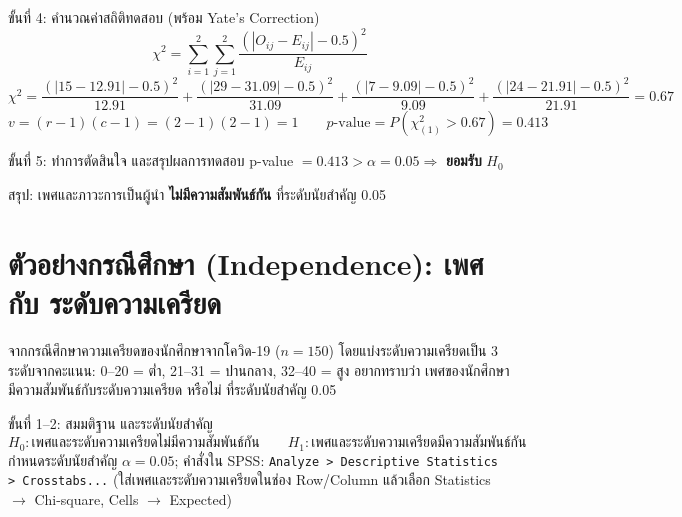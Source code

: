 \documentclass[10pt]{extarticle}
\begin{document}
\begin{stepbox}{ขั้นที่ 4: คำนวณค่าสถิติทดสอบ (พร้อม Yate's Correction)}
$$\chi^2=\sum_{i=1}^2\sum_{j=1}^2\frac{\left(|O_{ij}-E_{ij}|-0.5\right)^2}{E_{ij}}$$
$$\chi^2=\frac{(|15-12.91|-0.5)^2}{12.91}+\frac{(|29-31.09|-0.5)^2}{31.09}+\frac{(|7-9.09|-0.5)^2}{9.09}+\frac{(|24-21.91|-0.5)^2}{21.91}=0.67$$
$$v=(r-1)(c-1)=(2-1)(2-1)=1 \qquad p\text{-value}=P(\chi^2_{(1)}>0.67)=0.413$$
\end{stepbox}

\begin{stepbox}{ขั้นที่ 5: ทำการตัดสินใจ และสรุปผลการทดสอบ}
p-value $=0.413>\alpha=0.05\Rightarrow$ \textbf{ยอมรับ} $H_0$

สรุป: เพศและภาวะการเป็นผู้นำ \textbf{ไม่มีความสัมพันธ์กัน} ที่ระดับนัยสำคัญ 0.05
\end{stepbox}

\clearpage
\section{ตัวอย่างกรณีศึกษา (Independence): เพศ กับ ระดับความเครียด}

\begin{qbox}
จากกรณีศึกษาความเครียดของนักศึกษาจากโควิด-19 ($n=150$) โดยแบ่งระดับความเครียดเป็น 3 ระดับจากคะแนน: 0--20 = ต่ำ, 21--31 = ปานกลาง, 32--40 = สูง อยากทราบว่า เพศของนักศึกษา มีความสัมพันธ์กับระดับความเครียด หรือไม่ ที่ระดับนัยสำคัญ 0.05
\end{qbox}

\begin{stepbox}{ขั้นที่ 1--2: สมมติฐาน และระดับนัยสำคัญ}
$$H_0:\text{เพศและระดับความเครียดไม่มีความสัมพันธ์กัน}\qquad H_1:\text{เพศและระดับความเครียดมีความสัมพันธ์กัน}$$
กำหนดระดับนัยสำคัญ $\alpha=0.05$; คำสั่งใน SPSS: \texttt{Analyze > Descriptive Statistics > Crosstabs...} (ใส่เพศและระดับความเครียดในช่อง Row/Column แล้วเลือก Statistics $\to$ Chi-square, Cells $\to$ Expected)
\end{stepbox}
\end{document}
